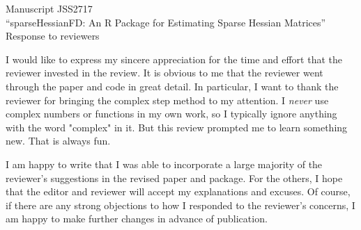 \documentclass{article}
\begin{document}
{\bfseries
\begin{center}
  Manuscript JSS2717\\
 ``sparseHessianFD: An R Package for Estimating Sparse
 Hessian Matrices''\\
 \vspace{\baselineskip}
 Response to reviewers
\end{center}
}
\vspace{\baselineskip}

I would like to express my sincere appreciation for the time and effort that
the reviewer invested in the review.  It is obvious to me that the
reviewer went through the paper and code in great detail.  In
particular, I want to thank the reviewer for bringing the complex step
method to my attention.  I \emph{never} use complex numbers or
functions in my own work, so I typically ignore anything with the word
"complex" in it.  But this review prompted me to learn something new.
That is always fun.

I am happy to write that I was able to incorporate a large majority of
the reviewer's suggestions in the revised paper and package. For the
others, I hope that the editor and reviewer will accept my
explanations and excuses.  Of course, if there are any strong
objections to how I responded to the reviewer's concerns, I am happy
to make further changes in advance of publication.

\vspace{\baselineskip}
\end{document}

